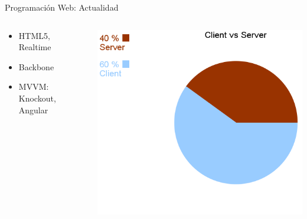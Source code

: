 \documentclass[xcolor=dvipsnames, 14pt]{beamer}
\begin{document}
\begin{frame}{Programación Web: Actualidad}

\begin{columns}[c]
    \begin{column}{0.5\textwidth}
        \begin{itemize}
            \item HTML5, Realtime
            \item Backbone
            \item MVVM: Knockout, Angular
        \end{itemize}
    \end{column}
    \begin{column}{0.5\textwidth}
        \begin{center}
            \includegraphics[width=\textwidth]{img/actualidad2.png}
        \end{center}
    \end{column}
\end{columns}

\end{frame}
\end{document}
